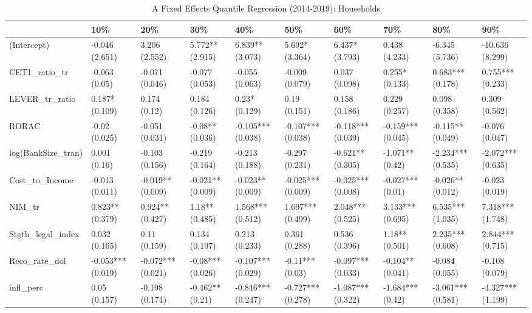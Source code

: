 \begin{table}[ht]
\centering
\caption{A Fixed Effects Quantile Regression (2014-2019): Households} 
\begingroup\small
\begin{tabular}{llllllllll}
  \toprule
 & 10\% & 20\% & 30\% & 40\% & 50\% & 60\% & 70\% & 80\% & 90\% \\ 
  \midrule
(Intercept) & -0.046 (2.651) & 3.206 (2.552) & 5.772** (2.915) & 6.839** (3.073) & 5.692* (3.364) & 6.437* (3.793) & 0.438 (4.233) & -6.345 (5.736) & -10.636 (8.299) \\ 
  CET1\_ratio\_tr & -0.063 (0.05) & -0.071 (0.046) & -0.077 (0.053) & -0.055 (0.063) & -0.009 (0.079) & 0.037 (0.098) & 0.255* (0.133) & 0.683*** (0.178) & 0.755*** (0.233) \\ 
  LEVER\_tr\_ratio & 0.187* (0.109) & 0.174 (0.12) & 0.184 (0.126) & 0.23* (0.129) & 0.19 (0.151) & 0.158 (0.186) & 0.229 (0.257) & 0.098 (0.358) & 0.309 (0.562) \\ 
  RORAC & -0.02 (0.025) & -0.051 (0.031) & -0.08** (0.036) & -0.105*** (0.038) & -0.107*** (0.038) & -0.118*** (0.039) & -0.159*** (0.045) & -0.115** (0.049) & -0.076 (0.047) \\ 
  log(BankSize\_tran) & 0.001 (0.16) & -0.103 (0.156) & -0.219 (0.164) & -0.213 (0.188) & -0.297 (0.231) & -0.621** (0.305) & -1.071** (0.42) & -2.234*** (0.535) & -2.072*** (0.635) \\ 
  Cost\_to\_Income & -0.013 (0.011) & -0.019** (0.009) & -0.021** (0.009) & -0.023** (0.009) & -0.025*** (0.009) & -0.025*** (0.008) & -0.027*** (0.01) & -0.026** (0.012) & -0.023 (0.019) \\ 
  NIM\_tr & 0.823** (0.379) & 0.924** (0.427) & 1.18** (0.485) & 1.568*** (0.512) & 1.697*** (0.499) & 2.048*** (0.525) & 3.133*** (0.695) & 6.535*** (1.035) & 7.318*** (1.748) \\ 
  Stgth\_legal\_index & 0.032 (0.165) & 0.11 (0.159) & 0.134 (0.197) & 0.213 (0.233) & 0.361 (0.288) & 0.536 (0.396) & 1.18** (0.501) & 2.235*** (0.608) & 2.844*** (0.715) \\ 
  Reco\_rate\_dol & -0.053*** (0.019) & -0.072*** (0.021) & -0.08*** (0.026) & -0.107*** (0.029) & -0.11*** (0.03) & -0.097*** (0.033) & -0.104** (0.041) & -0.084 (0.055) & -0.108 (0.079) \\ 
  infl\_perc & 0.05 (0.157) & -0.198 (0.174) & -0.462** (0.21) & -0.846*** (0.247) & -0.727*** (0.278) & -1.087*** (0.322) & -1.684*** (0.42) & -3.061*** (0.581) & -4.327*** (1.199) \\ 

\end{tabular}
\end{table}
